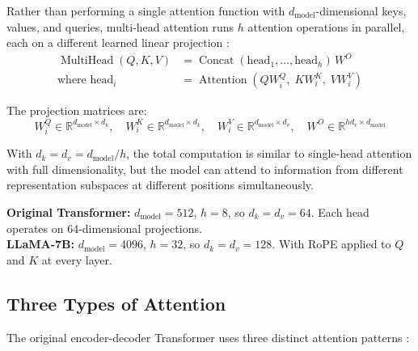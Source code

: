 \documentclass[11pt,a4paper]{article}
\newcommand{\R}{\mathbb{R}}
\newcommand{\Attention}{\operatorname{Attention}}
\newcommand{\MultiHead}{\operatorname{MultiHead}}
\newcommand{\Concat}{\operatorname{Concat}}
\newcommand{\dmodel}{d_{\text{model}}}
\newcommand{\dk}{d_k}
\newcommand{\dv}{d_v}
\begin{document}
Rather than performing a single attention function with $\dmodel$-dimensional keys,
values, and queries, multi-head attention runs $h$ attention operations in parallel, each
on a different learned linear projection \cite{vaswani2017}:
\begin{align}
  \MultiHead(Q, K, V) &= \Concat(\text{head}_1, \ldots, \text{head}_h) \, W^O \\
  \text{where } \text{head}_i &= \Attention(Q W_i^Q, \; K W_i^K, \; V W_i^V)
\end{align}

The projection matrices are:
\begin{equation}
  W_i^Q \in \R^{\dmodel \times \dk}, \quad
  W_i^K \in \R^{\dmodel \times \dk}, \quad
  W_i^V \in \R^{\dmodel \times \dv}, \quad
  W^O \in \R^{h\dv \times \dmodel}
\end{equation}

With $\dk = \dv = \dmodel / h$, the total computation is similar to single-head attention
with full dimensionality, but the model can attend to information from different
representation subspaces at different positions simultaneously.

\begin{dimbox}
\textbf{Original Transformer:} $\dmodel = 512$, $h = 8$, so $\dk = \dv = 64$. Each head
operates on 64-dimensional projections.\\[4pt]
\textbf{LLaMA-7B:} $\dmodel = 4096$, $h = 32$, so $\dk = \dv = 128$. With RoPE applied
to $Q$ and $K$ at every layer.
\end{dimbox}

\subsection{Three Types of Attention}
\label{sec:attention-types}

The original encoder-decoder Transformer uses three distinct attention patterns
\cite{vaswani2017}:
\end{document}
